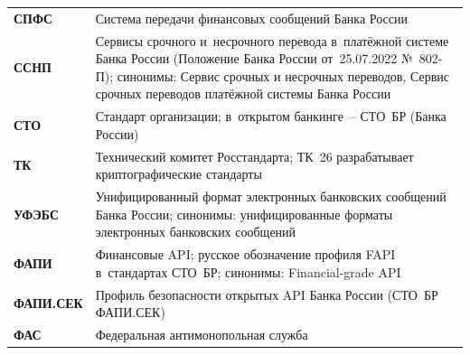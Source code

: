 \begin{longtable}{@{}p{4.5em}p{\dimexpr\linewidth-4.5em-2\tabcolsep\relax}@{}}
  \textbf{СПФС}              & Система передачи финансовых сообщений Банка России                                                                                                                                                                                                                                               \\
  \textbf{ССНП}              & Сервисы срочного и~несрочного перевода в~платёжной системе Банка России (Положение Банка России от~25.07.2022 №~802-П); синонимы: Сервис срочных и несрочных переводов, Сервис срочных переводов платёжной системы Банка России                                                                   \\
  \textbf{СТО}               & Стандарт организации; в~открытом банкинге~-- СТО~БР (Банка России)                                                                                                                                                                                                                               \\
  \textbf{ТК}                & Технический комитет Росстандарта; ТК~26 разрабатывает криптографические стандарты                                                                                                                                                                                                                \\
  \textbf{УФЭБС}             & Унифицированный формат электронных банковских сообщений Банка России; синонимы: унифицированные форматы электронных банковских сообщений                                                                                                                                                         \\
  \textbf{ФАПИ}              & Финансовые API; русское обозначение профиля FAPI в~стандартах СТО~БР; синонимы: Financial-grade API                                                                                                                                                                                              \\
  \textbf{ФАПИ.\-СЕК}          & Профиль безопасности открытых API Банка России (СТО~БР ФАПИ.СЕК)                                                                                                                                                                                                                                 \\
  \textbf{ФАС}               & Федеральная антимонопольная служба                                                                                                                                                                                                                                                               \\

\end{longtable}
